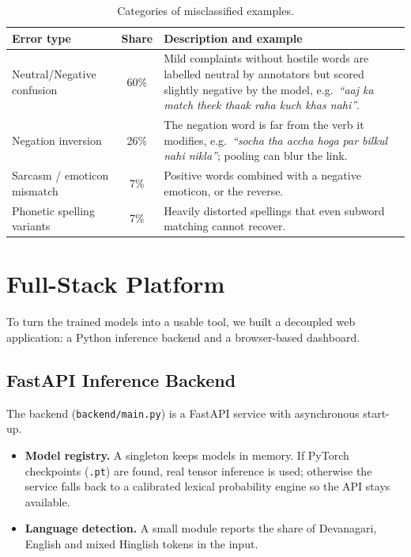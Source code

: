 \documentclass[11pt,a4paper]{article}
\begin{document}
\begin{table}[htbp]
\centering
\small
\begin{tabularx}{\textwidth}{@{}lcX@{}}
\toprule
\textbf{Error type} & \textbf{Share} & \textbf{Description and example} \\
\midrule
Neutral/Negative confusion & 60\% & Mild complaints without hostile words are labelled neutral by annotators but scored slightly negative by the model, e.g.\ \textit{``aaj ka match theek thaak raha kuch khas nahi''}. \\
Negation inversion & 26\% & The negation word is far from the verb it modifies, e.g.\ \textit{``socha tha accha hoga par bilkul nahi nikla''}; pooling can blur the link. \\
Sarcasm / emoticon mismatch & 7\% & Positive words combined with a negative emoticon, or the reverse. \\
Phonetic spelling variants & 7\% & Heavily distorted spellings that even subword matching cannot recover. \\
\bottomrule
\end{tabularx}
\caption{Categories of misclassified examples.}
\label{tab:errors}
\end{table}

\section{Full-Stack Platform}

To turn the trained models into a usable tool, we built a decoupled web application: a Python inference backend and a browser-based dashboard.

\subsection{FastAPI Inference Backend}
The backend (\texttt{backend/main.py}) is a FastAPI service with asynchronous start-up.
\begin{itemize}
    \item \textbf{Model registry.} A singleton keeps models in memory. If PyTorch checkpoints (\texttt{.pt}) are found, real tensor inference is used; otherwise the service falls back to a calibrated lexical probability engine so the API stays available.
    \item \textbf{Language detection.} A small module reports the share of Devanagari, English and mixed Hinglish tokens in the input.
\end{itemize}
\end{document}
